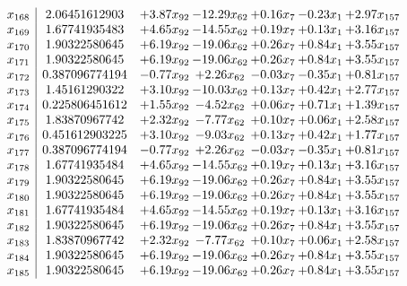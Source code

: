 \documentclass[8pt]{article}
\begin{document}
\[\begin{array}{c| c c@{\hskip 2pt} c@{\hskip 2pt} c@{\hskip 2pt} c@{\hskip 2pt} c@{\hskip 2pt} }
 x_{168}   &  2.06451612903 & +  3.87 x_{92} & -12.29 x_{62} & +  0.16 x_{7} & -0.23 x_{1} & +  2.97 x_{157}\\
 x_{169}   &  1.67741935483 & +  4.65 x_{92} & -14.55 x_{62} & +  0.19 x_{7} & +  0.13 x_{1} & +  3.16 x_{157}\\
 x_{170}   &  1.90322580645 & +  6.19 x_{92} & -19.06 x_{62} & +  0.26 x_{7} & +  0.84 x_{1} & +  3.55 x_{157}\\
 x_{171}   &  1.90322580645 & +  6.19 x_{92} & -19.06 x_{62} & +  0.26 x_{7} & +  0.84 x_{1} & +  3.55 x_{157}\\
 x_{172}   &  0.387096774194 & -0.77 x_{92} & +  2.26 x_{62} & -0.03 x_{7} & -0.35 x_{1} & +  0.81 x_{157}\\
 x_{173}   &  1.45161290322 & +  3.10 x_{92} & -10.03 x_{62} & +  0.13 x_{7} & +  0.42 x_{1} & +  2.77 x_{157}\\
 x_{174}   &  0.225806451612 & +  1.55 x_{92} & -4.52 x_{62} & +  0.06 x_{7} & +  0.71 x_{1} & +  1.39 x_{157}\\
 x_{175}   &  1.83870967742 & +  2.32 x_{92} & -7.77 x_{62} & +  0.10 x_{7} & +  0.06 x_{1} & +  2.58 x_{157}\\
 x_{176}   &  0.451612903225 & +  3.10 x_{92} & -9.03 x_{62} & +  0.13 x_{7} & +  0.42 x_{1} & +  1.77 x_{157}\\
 x_{177}   &  0.387096774194 & -0.77 x_{92} & +  2.26 x_{62} & -0.03 x_{7} & -0.35 x_{1} & +  0.81 x_{157}\\
 x_{178}   &  1.67741935484 & +  4.65 x_{92} & -14.55 x_{62} & +  0.19 x_{7} & +  0.13 x_{1} & +  3.16 x_{157}\\
 x_{179}   &  1.90322580645 & +  6.19 x_{92} & -19.06 x_{62} & +  0.26 x_{7} & +  0.84 x_{1} & +  3.55 x_{157}\\
 x_{180}   &  1.90322580645 & +  6.19 x_{92} & -19.06 x_{62} & +  0.26 x_{7} & +  0.84 x_{1} & +  3.55 x_{157}\\
 x_{181}   &  1.67741935484 & +  4.65 x_{92} & -14.55 x_{62} & +  0.19 x_{7} & +  0.13 x_{1} & +  3.16 x_{157}\\
 x_{182}   &  1.90322580645 & +  6.19 x_{92} & -19.06 x_{62} & +  0.26 x_{7} & +  0.84 x_{1} & +  3.55 x_{157}\\
 x_{183}   &  1.83870967742 & +  2.32 x_{92} & -7.77 x_{62} & +  0.10 x_{7} & +  0.06 x_{1} & +  2.58 x_{157}\\
 x_{184}   &  1.90322580645 & +  6.19 x_{92} & -19.06 x_{62} & +  0.26 x_{7} & +  0.84 x_{1} & +  3.55 x_{157}\\
 x_{185}   &  1.90322580645 & +  6.19 x_{92} & -19.06 x_{62} & +  0.26 x_{7} & +  0.84 x_{1} & +  3.55 x_{157}\\

\end{array}\]
\end{document}
